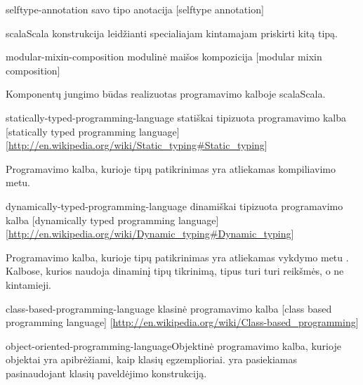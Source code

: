 \begin{glossary}
\begin{entry}
  \end{entry}

  \begin{entry}%
    {selftype-annotation}%
    {savo tipo anotacija}%
    [selftype annotation]

    \gls{scala}{Scala} konstrukcija leidžianti specialiajam kintamajam
     priskirti kitą tipą.

  \end{entry}

  \begin{entry}%
    {modular-mixin-composition}%
    {modulinė maišos kompozicija}%
    [modular mixin composition]

    Komponentų jungimo būdas realizuotas programavimo kalboje
    \gls{scala}{Scala}.
    
  \end{entry}

  \begin{entry}%
    {statically-typed-programming-language}%
    {statiškai tipizuota programavimo kalba}%
    [statically typed programming language]%
    [\url{http://en.wikipedia.org/wiki/Static_typing\#Static_typing}]

    Programavimo kalba, kurioje tipų patikrinimas yra atliekamas
    kompiliavimo metu.\cite[2]{Madsen:1990:STO:97946.97964}
    
  \end{entry}

  \begin{entry}%
    {dynamically-typed-programming-language}%
    {dinamiškai tipizuota programavimo kalba}%
    [dynamically typed programming language]%
    [\url{http://en.wikipedia.org/wiki/Dynamic_typing\#Dynamic_typing}]

    Programavimo kalba, kurioje tipų patikrinimas yra atliekamas vykdymo
    metu \cite[2]{Madsen:1990:STO:97946.97964}. Kalbose, kurios naudoja
    dinaminį tipų tikrinimą, tipus turi turi reikšmės, o ne kintamieji.
    
  \end{entry}

  \begin{entry}%
    {class-based-programming-language}%
    {klasinė programavimo kalba}%
    [class based programming language]%
    [\url{http://en.wikipedia.org/wiki/Class-based_programming}]

    \gls{object-oriented-programming-language}{Objektinė programavimo
    kalba}, kurioje objektai yra apibrėžiami,
    kaip klasių egzemplioriai.  yra pasiekiamas
    pasinaudojant klasių paveldėjimo konstrukciją.


\end{entry}
\end{glossary}
